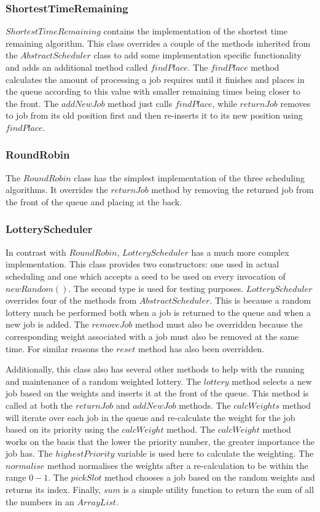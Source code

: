 \documentclass{article}
\begin{document}
\subsubsection{ShortestTimeRemaining}
$ShortestTimeRemaining$ contains the implementation of the shortest time remaining algorithm. This class overrides a couple of the methods inherited from the $AbstractScheduler$ class to add some implementation specific functionality and adds an additional method called $findPlace$. The $findPlace$ method calculates the amount of processing a job requires until it finishes and places in the queue according to this value with smaller remaining times being closer to the front. The $addNewJob$ method just calls $findPlace$, while $returnJob$ removes to job from its old position first and then re-inserts it to its new position using $findPlace$.

\subsubsection{RoundRobin}
The $RoundRobin$ class has the simplest implementation of the three scheduling algorithms. It overrides the $returnJob$ method by removing the returned job from the front of the queue and placing at the back.

\subsubsection{LotteryScheduler}
In contrast with $RoundRobin$, $LotteryScheduler$ has a much more complex implementation. This class provides two constructors: one used in actual scheduling and one which accepts a seed to be used on every invocation of $new Random()$. The second type is used for testing purposes. $LotteryScheduler$ overrides four of the methods from $AbstractScheduler$. This is because a random lottery much be performed both when a job is returned to the queue and when a new job is added. The $removeJob$ method must also be overridden because the corresponding weight associated with a job must also be removed at the same time. For similar reasons the $reset$ method has also been overridden.

Additionally, this class also has several other methods to help with the running and maintenance of a random weighted lottery. The $lottery$ method selects a new job based on the weights and inserts it at the front of the queue. This method is called at both the $returnJob$ and $addNewJob$ methods. The $calcWeights$ method will iterate over each job in the queue and re-calculate the weight for the job based on its priority using the $calcWeight$ method. The $calcWeight$ method works on the basis that the lower the priority number, the greater importance the job has. The $highestPriority$ variable is used here to calculate the weighting. The $normalise$ method normalises the weights after a re-calculation to be within the range $0-1$. The $pickSlot$ method chooses a job based on the random weights and returns its index. Finally, $sum$ is a simple utility function to return the sum of all the numbers in an $ArrayList$.
\end{document}
